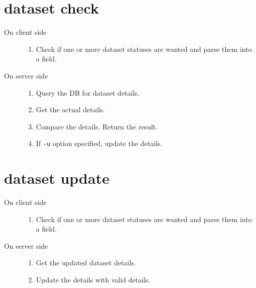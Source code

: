 \documentclass{scrreprt}
\begin{document}
\section{dataset check} 
\begin{description}

%
\item[On client side] \hfill
\begin{enumerate} 
\item Check if one or more dataset statuses are wanted and parse them into a field.

\end{enumerate}
%
\item[On server side] \hfill
\begin{enumerate} 
\item Query the DB for dataset details.
\item Get the actual details.
\item Compare the details. Return the result.
\item If \texttt{-u} option specified, update the details.

\end{enumerate}

\end{description}



\section{dataset update} 
\begin{description}

%
\item[On client side] \hfill
\begin{enumerate} 
\item Check if one or more dataset statuses are wanted and parse them into a field.

\end{enumerate}
%
\item[On server side] \hfill
\begin{enumerate} 
\item Get the updated dataset details.
\item Update the details with valid details.

\end{enumerate}

\end{description}
\end{document}
